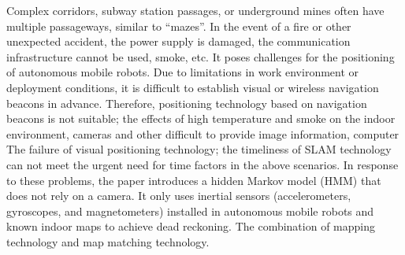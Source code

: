 \documentclass{llncs}
\begin{document}
Complex corridors, subway station passages, or underground mines often have multiple passageways, similar to “mazes”. In the event of a fire or other unexpected accident, the power supply is damaged, the communication infrastructure cannot be used, smoke, etc. It poses challenges for the positioning of autonomous mobile robots. Due to limitations in work environment or deployment conditions, it is difficult to establish visual or wireless navigation beacons in advance. Therefore, positioning technology based on navigation beacons is not suitable; the effects of high temperature and smoke on the indoor environment, cameras and other difficult to provide image information, computer The failure of visual positioning technology; the timeliness of SLAM technology can not meet the urgent need for time factors in the above scenarios. In response to these problems, the paper introduces a hidden Markov model (HMM) that does not rely on a camera. It only uses inertial sensors (accelerometers, gyroscopes, and magnetometers) installed in autonomous mobile robots and known indoor maps to achieve dead reckoning. The combination of mapping technology and map matching technology.


\end{document}
